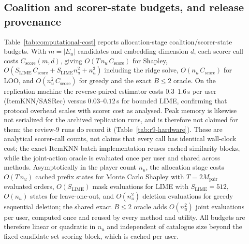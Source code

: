 \documentclass[manuscript,screen,anonymous]{acmart}
\begin{document}
\subsection{Coalition and scorer-state budgets, and release provenance}
Table~\ref{tab:computational-cost} reports allocation-stage coalition/scorer-state budgets. With $m=|E_u|$ candidates and embedding dimension $d$, each scorer call costs $C_{\mathrm{score}}(m,d)$, giving $O(T\,n_u\,C_{\mathrm{score}})$ for Shapley, $O(S_{\mathrm{LIME}}\,C_{\mathrm{score}}+S_{\mathrm{LIME}}n_u^2+n_u^3)$ including the ridge solve, $O(n_u\,C_{\mathrm{score}})$ for LOO, and $O(n_u^2\,C_{\mathrm{score}})$ for greedy and the exact $B\le2$ oracle. On the replication machine the reverse-paired estimator costs $0.3$--$1.6$\,s per user (ItemKNN/SASRec) versus $0.03$--$0.12$\,s for bounded LIME, confirming that protocol overhead scales with scorer cost as analysed. Peak memory is likewise not serialized for the archived replication runs, and is therefore not claimed for them; the review-$9$ runs do record it (Table~\ref{tab:r9-hardware}). These are analytical scorer-call counts, not claims that every call has identical wall-clock cost; the exact ItemKNN batch implementation reuses cached similarity blocks, while the joint-action oracle is evaluated once per user and shared across methods. Asymptotically in the player count $n_u$, the allocation stage costs $O(T\,n_u)$ cached prefix states for Monte Carlo Shapley with $T=2M_{\mathrm{pair}}$ evaluated orders, $O(S_{\mathrm{LIME}})$ mask evaluations for LIME with $S_{\mathrm{LIME}}=512$, $O(n_u)$ states for leave-one-out, and $O(n_u^2)$ deletion evaluations for greedy sequential deletion; the shared exact $B\le2$ oracle adds $O(n_u^2)$ joint evaluations per user, computed once and reused by every method and utility. All budgets are therefore linear or quadratic in $n_u$ and independent of catalogue size beyond the fixed candidate-set scoring block, which is cached per user.
\end{document}
